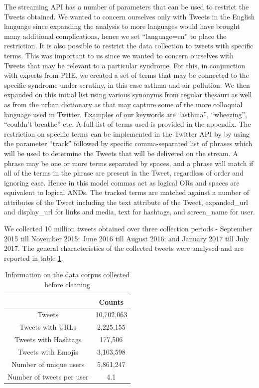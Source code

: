 \documentclass[10pt,letterpaper]{article}
\begin{document}
The streaming API has a number of parameters that can be used to restrict the Tweets obtained.  We wanted to concern ourselves only with Tweets in the English language since expanding the analysis to more languages would have brought many additional complications, hence we set ``language=en'' to place the restriction.  It is also possible to restrict the data collection to tweets with specific terms.  This was important to us since we wanted to concern ourselves with Tweets that may be relevant to a particular syndrome.  For this, in conjunction with experts from PHE,  we created a set of terms that may be connected to the specific syndrome under scrutiny, in this case asthma and air pollution. We then expanded on this initial list using various synonyms from regular thesauri as well as from the urban dictionary as that may capture some of the more colloquial language used in Twitter. Examples of our keywords are ``asthma'', ``wheezing'', ``couldn't breathe'' etc. A full list of terms used is provided in the appendix. The restriction on specific terms can be implemented in the Twitter API by by using the parameter ``track'' followed by specific comma-separated list of phrases which will be used to determine the Tweets that will be delivered on the stream.  A phrase may be one or more terms separated by spaces, and a phrase will match if all of the terms in the phrase are present in the Tweet, regardless of order and ignoring case.  Hence in this model commas act as logical ORs and spaces are equivalent to logical ANDs.  The tracked terms are matched against a number of attributes of the Tweet including the text attribute of the Tweet, expanded\_url and display\_url for links and media, text for hashtags, and screen\_name for user.  

We collected 10 million tweets obtained over three collection periods - September 2015 till November 2015; June 2016 till August 2016; and January 2017 till July 2017. The general characteristics of the collected tweets were analysed and are reported in table \ref{table:1}.

\begin{table}[h!]
\centering
\begin{tabular}{ | c | c |} 
\hline
& Counts \\
\hline
Tweets & 10,702,063\\ 
 Tweets with URLs & 2,225,155\\
 Tweets with Hashtags & 177,506\\
 Tweets with Emojis & 3,103,598\\
 Number of unique users & 5,861,247\\
 Number of tweets per user & 4.1\\
 \hline
\end{tabular}
\caption{Information on the data corpus collected before cleaning}
\label{table:1}
\end{table}
\end{document}
